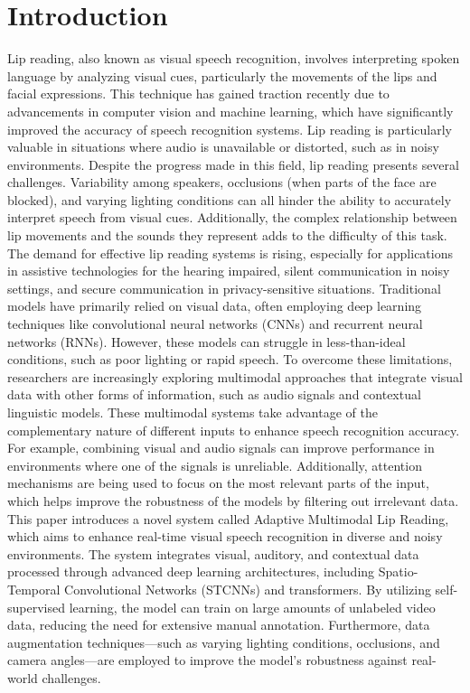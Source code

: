 \documentclass[conference]{IEEEtran}
\begin{document}
\section{Introduction} Lip reading, also known as visual speech recognition, involves interpreting spoken language by analyzing visual cues, particularly the movements of the lips and facial expressions. This technique has gained traction recently due to advancements in computer vision and machine learning, which have significantly improved the accuracy of speech recognition systems. Lip reading is particularly valuable in situations where audio is unavailable or distorted, such as in noisy environments.
Despite the progress made in this field, lip reading presents several challenges. Variability among speakers, occlusions (when parts of the face are blocked), and varying lighting conditions can all hinder the ability to accurately interpret speech from visual cues. Additionally, the complex relationship between lip movements and the sounds they represent adds to the difficulty of this task.
The demand for effective lip reading systems is rising, especially for applications in assistive technologies for the hearing impaired, silent communication in noisy settings, and secure communication in privacy-sensitive situations. Traditional models have primarily relied on visual data, often employing deep learning techniques like convolutional neural networks (CNNs) and recurrent neural networks (RNNs). However, these models can struggle in less-than-ideal conditions, such as poor lighting or rapid speech.
To overcome these limitations, researchers are increasingly exploring multimodal approaches that integrate visual data with other forms of information, such as audio signals and contextual linguistic models. These multimodal systems take advantage of the complementary nature of different inputs to enhance speech recognition accuracy. For example, combining visual and audio signals can improve performance in environments where one of the signals is unreliable. Additionally, attention mechanisms are being used to focus on the most relevant parts of the input, which helps improve the robustness of the models by filtering out irrelevant data.
This paper introduces a novel system called Adaptive Multimodal Lip Reading, which aims to enhance real-time visual speech recognition in diverse and noisy environments. The system integrates visual, auditory, and contextual data processed through advanced deep learning architectures, including Spatio-Temporal Convolutional Networks (STCNNs) and transformers. By utilizing self-supervised learning, the model can train on large amounts of unlabeled video data, reducing the need for extensive manual annotation. Furthermore, data augmentation techniques—such as varying lighting conditions, occlusions, and camera angles—are employed to improve the model's robustness against real-world challenges.
\end{document}

